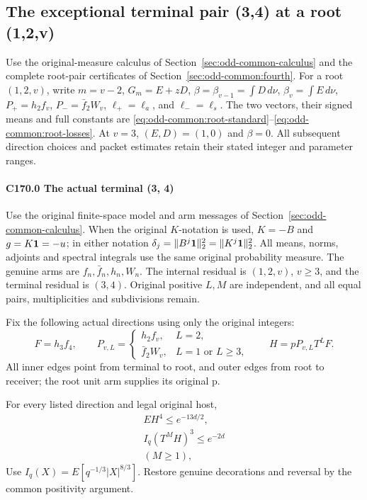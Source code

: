 \subsection{The exceptional terminal pair (3,4) at a root (1,2,v)}\label{proof:Q5-C170}
Use the original-measure calculus of
Section~\ref{sec:odd-common-calculus} and the complete root-pair
certificates of Section~\ref{sec:odd-common:fourth}.
For a root \((1,2,v)\), write \(m=v-2\), \(G_m=E+zD\),
\(\beta=\beta_{v-1}=\int D\,d\nu\),
\(\beta_v=\int E\,d\nu\),
\(P_+=h_2f_v\), \(P_-=\bar f_2W_v\),
\(\ell_+=\ell_a\), and \(\ell_-=\ell_s\).
The two vectors, their signed means and full constants are
\eqref{eq:odd-common:root-standard}--\eqref{eq:odd-common:root-losses}.
At \(v=3\), \((E,D)=(1,0)\) and \(\beta=0\).
All subsequent direction choices and packet estimates retain their
stated integer and parameter ranges.
\paragraph{C170.0 The actual terminal (3, 4)}

Use the original finite-space model and arm messages of
Section~\ref{sec:odd-common-calculus}.
When the original \(K\)-notation is used, \(K=-B\) and
\(g=K\mathbf1=-u\); in either notation
\(\delta_j=\|B^j\mathbf1\|_2^2=\|K^j\mathbf1\|_2^2\).
All means, norms, adjoints and spectral integrals use the same
original probability measure.
The genuine arms are \(f_n,\allowbreak \allowbreak  \bar f_n,\allowbreak \allowbreak  h_n,\allowbreak \allowbreak  W_n\). The internal residual is \((1,\allowbreak \allowbreak  2,\allowbreak \allowbreak  v)\), \(v\ge3\), and the terminal residual is \((3,\allowbreak \allowbreak  4)\). Original positive \(L,\allowbreak \allowbreak  M\) are independent, and all equal pairs, multiplicities and subdivisions remain.

Fix the following actual directions using only the original integers:
\[
F=h_3f_4,\qquad
P_{v,L}=\begin{cases}h_2f_v,&L=2,\\ \bar f_2W_v,&L=1\text{ or }L\ge 3,\end{cases}
\qquad H=pP_{v,L}T^LF.
\]
All inner edges point from terminal to root, and outer edges from root to receiver; the root unit arm supplies its original p.

For every listed direction and legal original host,
\[
\boxed{\begin{gathered}
EH^4\le e^{-13d/2},\\
I_q(T^MH)^3\le e^{-2d}\\
(M\ge 1),
\end{gathered}}\tag{C170.T178.1}
\]
Use \(I_q(X)=E[q^{-1/3}|X|^{8/3}]\). Restore genuine decorations and reversal by the common positivity argument.


